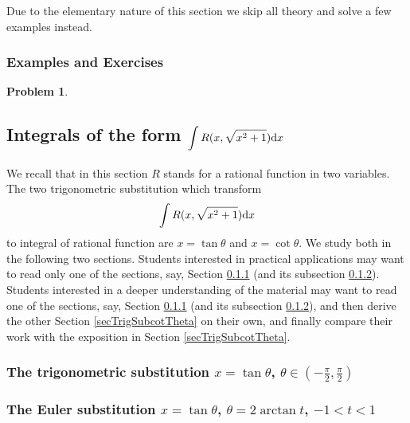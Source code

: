 \documentclass[12pt]{book}
\newtheorem{problem}[theorem]{Problem}
\begin{document}
Due to the elementary nature of this section we skip all theory and solve a few examples instead.
\subsubsection{Examples and Exercises}

\begin{problem}

\end{problem}


\subsection{Integrals of the form $\displaystyle \int R(x,\sqrt{x^2+1}){\normalfont \text{d}} x$}
We recall that in this section $R$ stands for a rational function in two variables. The two trigonometric substitution which transform
\[
\int R(x, \sqrt{x^2+1}){\normalfont \text{d}} x
\]
to integral of rational function are $x=\tan \theta$ and $x=\cot \theta$. We study both in the following two sections. Students interested in practical applications may want to read only one of the sections, say, Section \ref{secTrigSubtanTheta} (and its subsection \ref{secTrigSubtan(2arctant)}). Students interested in a deeper understanding of the material may want to read one of the sections, say,  Section \ref{secTrigSubtanTheta} (and its subsection \ref{secTrigSubtan(2arctant)}), and then derive the other Section \ref{secTrigSubcotTheta} on their own, and finally compare their work with the exposition in Section \ref{secTrigSubcotTheta}.
\subsubsection{The trigonometric substitution $x=\tan \theta$, $\displaystyle \theta\in \left(-\frac{\pi}{2}, \frac{\pi}{2}\right)$ }\label{secTrigSubtanTheta}


\subsubsection{The Euler substitution $x=\tan \theta$, $\theta=2\arctan t$, $-1<  t< 1$} \label{secTrigSubtan(2arctant)}

\end{document}
